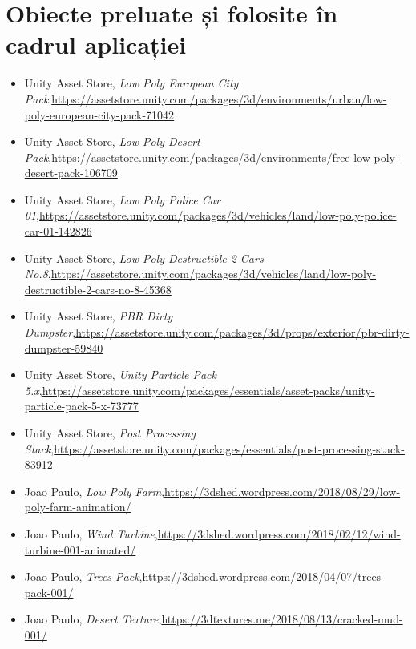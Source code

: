 \section{Obiecte preluate și folosite în cadrul aplicației}
\begin{itemize}
    \item{Unity Asset Store, \textit{Low Poly European City Pack},\newline \url{https://assetstore.unity.com/packages/3d/environments/urban/low-poly-european-city-pack-71042}}
	\item{Unity Asset Store, \textit{Low Poly Desert Pack},\newline \url{https://assetstore.unity.com/packages/3d/environments/free-low-poly-desert-pack-106709}}
	\item{Unity Asset Store, \textit{Low Poly Police Car 01},\newline \url{https://assetstore.unity.com/packages/3d/vehicles/land/low-poly-police-car-01-142826}}
	\item{Unity Asset Store, \textit{Low Poly Destructible 2 Cars No.8},\newline \url{https://assetstore.unity.com/packages/3d/vehicles/land/low-poly-destructible-2-cars-no-8-45368}}
	\item{Unity Asset Store, \textit{PBR Dirty Dumpster},\newline \url{https://assetstore.unity.com/packages/3d/props/exterior/pbr-dirty-dumpster-59840}}
	\item{Unity Asset Store, \textit{Unity Particle Pack 5.x},\newline \url{https://assetstore.unity.com/packages/essentials/asset-packs/unity-particle-pack-5-x-73777}}
	\item{Unity Asset Store, \textit{Post Processing Stack},\newline \url{https://assetstore.unity.com/packages/essentials/post-processing-stack-83912}}
	\item{Joao Paulo, \textit{Low Poly Farm},\newline \url{https://3dshed.wordpress.com/2018/08/29/low-poly-farm-animation/}}
	\item{Joao Paulo, \textit{Wind Turbine},\newline \url{https://3dshed.wordpress.com/2018/02/12/wind-turbine-001-animated/}}
	\item{Joao Paulo, \textit{Trees Pack},\newline \url{https://3dshed.wordpress.com/2018/04/07/trees-pack-001/}}
	\item{Joao Paulo, \textit{Desert Texture},\newline \url{https://3dtextures.me/2018/08/13/cracked-mud-001/}}

\end{itemize}
